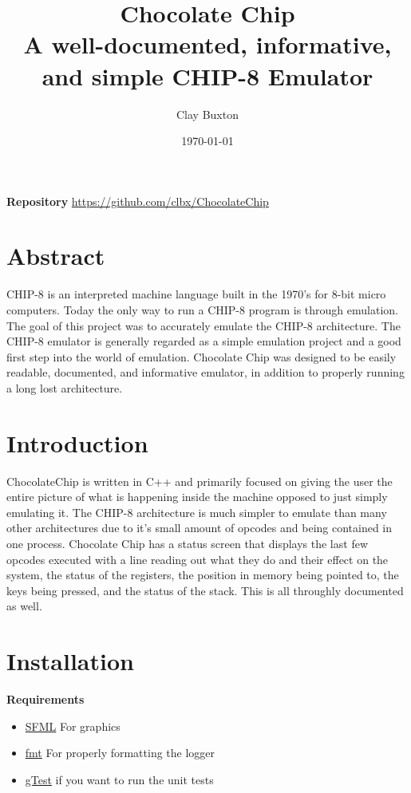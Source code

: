 \documentclass[12pt]{IEEEtran}
\author{Clay Buxton}
\title{%
Chocolate Chip \\
\large A well-documented, informative, and simple CHIP-8 Emulator}
\date{\today}
\begin{document}
\maketitle

\textbf{Repository} \href{https://github.com/clbx/ChocolateChip}{https://github.com/clbx/ChocolateChip}

\section{Abstract}
CHIP-8 is an interpreted machine language built in the 1970's for 8-bit
micro computers. Today the only way to run a CHIP-8 program is through emulation.
The goal of this project was to accurately emulate the CHIP-8 architecture. 
The CHIP-8 emulator is generally regarded as a simple emulation project and a good first step into 
the world of emulation. Chocolate Chip was designed to be easily readable, documented, and informative emulator,
in addition to properly running a long lost architecture.

\section{Introduction}
ChocolateChip is written in C++ and primarily focused on giving the user the entire picture of what is happening inside
the machine opposed to just simply emulating it. The CHIP-8 architecture is much simpler to emulate than many other architectures due
to it's small amount of opcodes and being contained in one process. Chocolate Chip has a status screen that displays the last few opcodes 
executed with a line reading out what they do and their effect on the system, the status of the registers, the position in memory being pointed to, the keys being pressed, and the status of the stack.
This is all throughly documented as well.

\section{Installation}

\textbf{Requirements}
\begin{itemize}
    \item \href{https://www.sfml-dev.org}{SFML} For graphics
    \item \href{http://fmtlib.net/latest/index.html}{fmt} For properly formatting the logger
    \item \href {https://github.com/google/googletest}{gTest} if you want to run the unit tests
\end{itemize}
\end{document}
